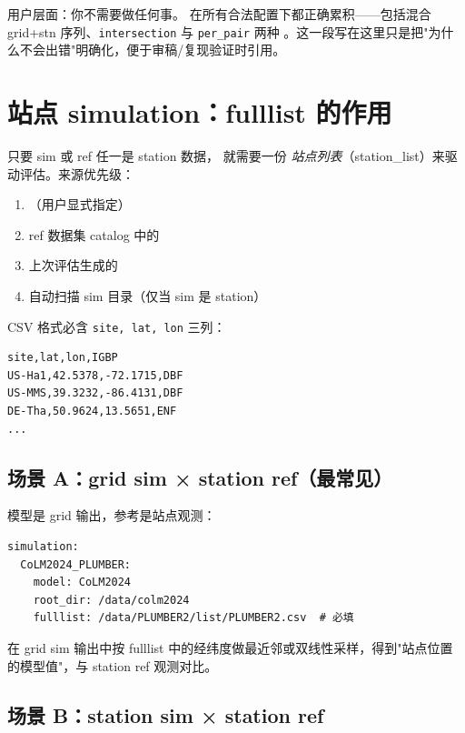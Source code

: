 用户层面：你不需要做任何事。 在所有合法配置下都正确累积——包括混合 grid+stn 序列、\texttt{intersection} 与 \texttt{per_pair} 两种 。这一段写在这里只是把"为什么不会出错"明确化，便于审稿/复现验证时引用。

\section{站点 simulation：fulllist 的作用}

只要 sim 或 ref 任一是 station 数据，\openbench{} 就需要一份 \emph{站点列表}（station\_list）来驱动评估。来源优先级：

\begin{enumerate}
  \item {}（用户显式指定）
  \item ref 数据集 catalog 中的 
  \item 上次评估生成的 
  \item 自动扫描 sim 目录（仅当 sim 是 station）
\end{enumerate}

CSV 格式必含 \texttt{site, lat, lon} 三列：

\begin{verbatim}
site,lat,lon,IGBP
US-Ha1,42.5378,-72.1715,DBF
US-MMS,39.3232,-86.4131,DBF
DE-Tha,50.9624,13.5651,ENF
...
\end{verbatim}

\subsection{场景 A：grid sim × station ref（最常见）}

模型是 grid 输出，参考是站点观测：

\begin{verbatim}
simulation:
  CoLM2024_PLUMBER:
    model: CoLM2024
    root_dir: /data/colm2024
    fulllist: /data/PLUMBER2/list/PLUMBER2.csv  # 必填
\end{verbatim}

\openbench{} 在 grid sim 输出中按 fulllist 中的经纬度做最近邻或双线性采样，得到"站点位置的模型值"，与 station ref 观测对比。

\subsection{场景 B：station sim × station ref}

